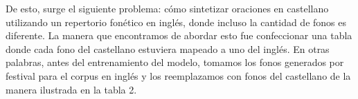 
De esto, surge el siguiente problema: cómo sintetizar oraciones en castellano utilizando un repertorio fonético en inglés, donde incluso la cantidad de fonos es diferente. La manera que encontramos de abordar esto fue confeccionar una tabla donde cada fono del castellano estuviera mapeado a uno del inglés. En otras palabras, antes del entrenamiento del modelo, tomamos los fonos generados por festival para el corpus en inglés y los reemplazamos con fonos del castellano de la manera ilustrada en la tabla 2.

